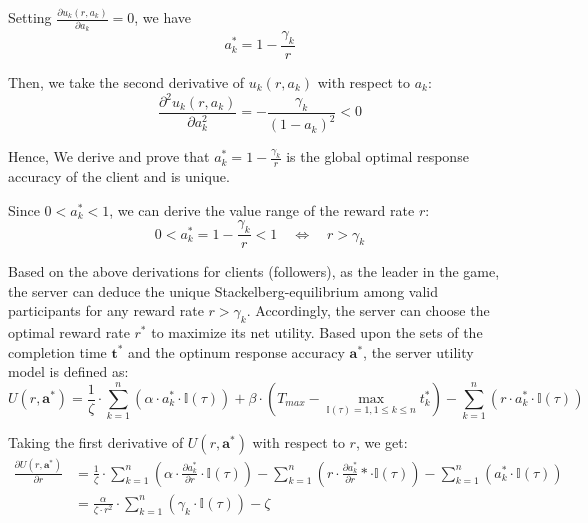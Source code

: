 \documentclass[final,1p,times]{elsarticle}
\begin{document}
Setting $\frac{\partial u_k(r,a_k)}{\partial a_k} = 0$, we have
\begin{equation}
	a_k^\ast = 1 - \frac{\gamma_k}{r}
\end{equation}	

Then, we take the second derivative of $u_k(r,a_k)$ with respect to $a_k$:
\begin{equation}
	\frac{\partial^2 u_k(r,a_k)}{\partial a_k^2} = - \frac{\gamma_k}{(1-a_k)^2} < 0
\end{equation}	

Hence, We derive and prove that $a_k^\ast = 1 - \frac{\gamma_k}{r}$ is the global optimal response accuracy of the client and is unique.

Since $0<a_k^\ast<1$, we can derive the value range of the reward rate $r$:
\begin{equation}
	0 < a_k^\ast = 1 - \frac{\gamma_k}{r} < 1\quad
	\Leftrightarrow\quad r > \gamma_k
\end{equation}	

Based on the above derivations for clients (followers), as the leader in the game, the server can deduce the unique Stackelberg-equilibrium among valid participants for any reward rate $r>\gamma_k$. Accordingly, the server can choose the optimal reward rate $r^\ast$ to maximize its net utility. Based upon the sets of the completion time $\bm{t}^\ast$ and the optinum response accuracy $\bm{a}^\ast$, the server utility model is defined as:
\begin{equation}
	U(r,\bm{a}^\ast) = \frac{1}{\zeta}\cdot \sum_{k=1}^n(\alpha\cdot a_k^\ast\cdot \mathbb{I}(\tau)) + \beta\cdot(T_{max}-\max_{\mathbb{I}(\tau)=1,1\le k\le n}t_k^\ast) - \sum_{k=1}^n(r\cdot a_k^\ast\cdot \mathbb{I}(\tau))
\end{equation}

Taking the first derivative of $U(r,\bm{a}^\ast)$ with respect to $r$, we get:
\begin{equation}
	\begin{aligned}
		\frac{\partial U(r,\bm{a}^\ast)}{\partial r} &= \frac{1}{\zeta}\cdot \sum_{k=1}^n(\alpha\cdot \frac{\partial a_k^\ast}{\partial r}\cdot \mathbb{I}(\tau)) - \sum_{k=1}^n(r\cdot \frac{\partial a_k^\ast}{\partial r}\ast\cdot \mathbb{I}(\tau)) - \sum_{k=1}^n(a_k^\ast\cdot \mathbb{I}(\tau))\\
		&= \frac{\alpha}{\zeta\cdot r^2}\cdot\sum_{k=1}^n(\gamma_k\cdot\mathbb{I}(\tau))-\zeta
	\end{aligned}
\end{equation}
\end{document}

